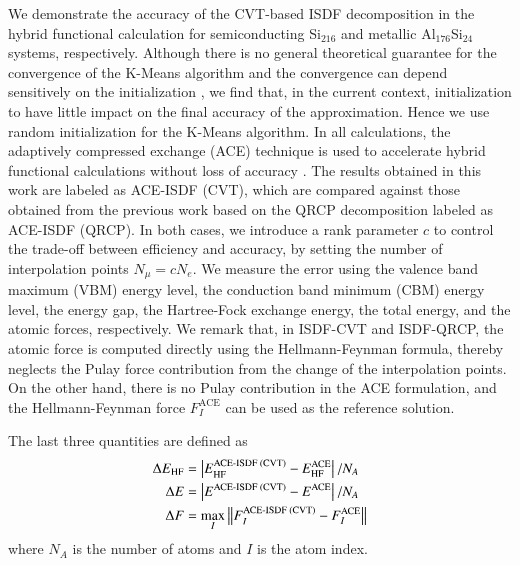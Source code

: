We demonstrate the accuracy of the CVT-based ISDF decomposition in the hybrid
functional calculation for semiconducting Si$_{216}$ and metallic Al$_{176}$Si$_
{24}$ systems, respectively. Although there is no general theoretical guarantee
for the convergence of the K-Means algorithm and the convergence can depend
sensitively on the initialization \cite{arthur2006slow,arthur2007k}, we find
that, in the current context,  initialization to have little impact on the final
accuracy of the approximation. Hence we use random initialization for the
K-Means algorithm. In all calculations, the adaptively compressed exchange (ACE)
technique is used to accelerate hybrid functional calculations without loss of
accuracy \cite{JCTC_12_2242_2016_ACE}. The results obtained in this work are
labeled as ACE-ISDF (CVT), which are compared against those obtained from the
previous work based on the QRCP decomposition \cite{JCTC_2017_ISDF} labeled as
ACE-ISDF (QRCP). In both cases, we introduce a rank parameter $c$ to control the
trade-off between efficiency and accuracy, by setting the number of
interpolation points $N_\mu = cN_e$. We measure the error using the valence band
maximum (VBM) energy level, the conduction band minimum (CBM) energy level, the
energy gap, the Hartree-Fock exchange energy, the total energy, and the atomic
forces, respectively. We remark that, in ISDF-CVT and ISDF-QRCP, the atomic
force is computed directly using the Hellmann-Feynman formula, thereby neglects
the Pulay force contribution from the change of the interpolation points. On the
other hand, there is no Pulay contribution in the ACE formulation, and the
Hellmann-Feynman force $F_I^\text{ACE}$ can be used as the reference solution.

The last three quantities are defined as
\begin{align*}
	\Delta{E_\text{HF}} &= \left\lvert E_\text{HF}^\text{ACE-ISDF (CVT)} - E_\text{HF}^
	\text{ACE}\right\rvert/N_{A}\\
	\Delta{E} &= \left\lvert E^\text{ACE-ISDF (CVT)} - E^\text{ACE}\right\rvert/N_{A}\\
	{\Delta}F &= \max_I\left\lVert F_I^\text{ACE-ISDF (CVT)} - F_I^\text{ACE}\right\rVert
\end{align*}
where $N_A$ is the number of atoms and $I$ is the atom index.

